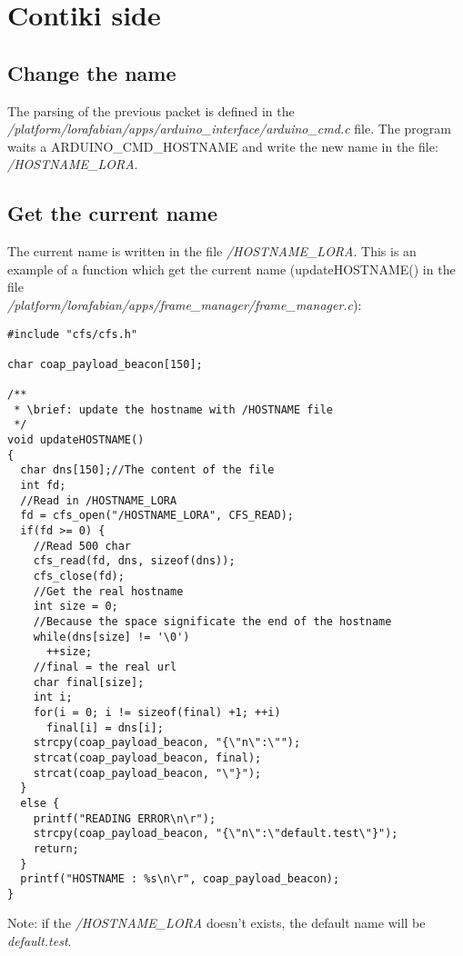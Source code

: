 \documentclass{article}
\begin{document}
\section{Contiki side}
\subsection{Change the name}
The parsing of the previous packet is defined in the\\ \emph{/platform/lorafabian/apps/arduino\_interface/arduino\_cmd.c} file. The program waits a ARDUINO\_CMD\_HOSTNAME and write the new name in the file: \emph{/HOSTNAME\_LORA}.
\subsection{Get the current name}
The current name is written in the file \emph{/HOSTNAME\_LORA}. This is an example of a function which get the current name (updateHOSTNAME() in the file\\ \emph{/platform/lorafabian/apps/frame\_manager/frame\_manager.c}):
\begin{verbatim}
#include "cfs/cfs.h"

char coap_payload_beacon[150];

/**
 * \brief: update the hostname with /HOSTNAME file
 */
void updateHOSTNAME()
{
  char dns[150];//The content of the file
  int fd;
  //Read in /HOSTNAME_LORA
  fd = cfs_open("/HOSTNAME_LORA", CFS_READ);
  if(fd >= 0) {
    //Read 500 char
    cfs_read(fd, dns, sizeof(dns));
    cfs_close(fd);
    //Get the real hostname
    int size = 0;
    //Because the space significate the end of the hostname
    while(dns[size] != '\0')
      ++size;
    //final = the real url
    char final[size];
    int i;
    for(i = 0; i != sizeof(final) +1; ++i)
      final[i] = dns[i];
    strcpy(coap_payload_beacon, "{\"n\":\"");
    strcat(coap_payload_beacon, final);
    strcat(coap_payload_beacon, "\"}");
  }
  else {
    printf("READING ERROR\n\r");
    strcpy(coap_payload_beacon, "{\"n\":\"default.test\"}");
    return;
  }
  printf("HOSTNAME : %s\n\r", coap_payload_beacon);
}
\end{verbatim}
Note: if the \emph{/HOSTNAME\_LORA} doesn't exists, the default name will be \emph{default.test}.
\end{document}
